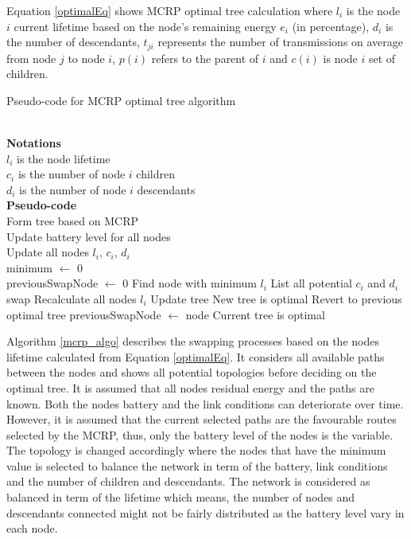 Equation \ref{optimalEq} shows MCRP optimal tree calculation where $l_i$ is the node $i$ current lifetime based on the node's remaining energy $e_i$ (in percentage), $d_i$ is the number of descendants, $t_{ji}$ represents the number of transmissions on average from node $j$ to node $i$, $p(i)$ refers to the parent of $i$ and $c(i)$ is node $i$ set of children.

\begin{algorithm}
\caption{Pseudo-code for MCRP optimal tree algorithm}
\label{mcrp_algo}
\begin{algorithmic}[]
\\\textbf{Notations}
\\$l_i$ is the node lifetime
\\$c_i$ is the number of node $i$ children
\\$d_i$ is the number of node $i$ descendants
\\\textbf{Pseudo-code}
\\Form tree based on MCRP
\\Update battery level for all nodes
\\Update all nodes $l_i$, $c_i$, $d_i$
\\minimum $\leftarrow$ 0
\\previousSwapNode $\leftarrow$ 0 
    \State Find node with minimum $l_i$
    \State List all potential $c_i$ and $d_i$ swap
		\State Recalculate all nodes $l_i$
			\State Update tree
			\State New tree is optimal
		\Else
			\State Revert to previous optimal tree
		\EndIf
			\State previousSwapNode $\leftarrow$ node
	\Else
		\State Current tree is optimal
	\EndIf
  \EndWhile
\end{algorithmic}
\end{algorithm}

Algorithm \ref{mcrp_algo} describes the swapping processes based on the nodes lifetime calculated from Equation \ref{optimalEq}. It considers all available paths between the nodes and shows all potential topologies before deciding on the optimal tree.
It is assumed that all nodes residual energy and the paths are known. Both the nodes battery and the link conditions can deteriorate over time. However, it is assumed that the current selected paths are the favourable routes selected by the MCRP, thus, only the battery level of the nodes is the variable. The topology is changed accordingly where the nodes that have the minimum value is selected to balance the network in term of the battery, link conditions and the number of children and descendants. The network is considered as balanced in term of the lifetime which means, the number of nodes and descendants connected might not be fairly distributed as the battery level vary in each node.

